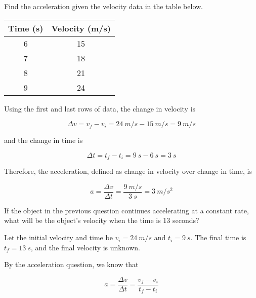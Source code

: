 \documentclass[answers]{exam}
\begin{document}
\begin{questions}
\question
Find the acceleration given the velocity data in the table below.

\begin{center}
    \begin{tabular}{|c|c|}
        \hline
        Time (s) & Velocity (m/s) \\ \hline
        6 & 15\\ \hline
        7 & 18\\ \hline
        8 & 21\\ \hline
        9 & 24 \\ \hline
    \end{tabular}
\end{center}

\begin{solutionorbox}[5cm]
    Using the first and last rows of data, the change in velocity is

\begin{equation*}
    \Delta v = v_f - v_i = \SI{24}{m/s} - \SI{15}{m/s} = \SI{9}{m/s}
\end{equation*}

and the change in time is

\begin{equation*}
    \Delta t = t_f - t_i = \SI{9}{s} - \SI{6}{s} = \SI{3}{s}
\end{equation*}

Therefore, the acceleration, defined as change in velocity over change in time, is

\begin{equation*}
    a = \frac{\Delta v}{\Delta t} = \frac{\SI{9}{m/s}}{\SI{3}{s}} = \boxed{\SI{3}{m/s^2}}
\end{equation*}
\end{solutionorbox}

\clearpage
\question
If the object in the previous question continues accelerating at a constant rate, what will be the object's velocity when the time is 13 seconds?

\begin{solutionorbox}[5cm]
Let the initial velocity and time be $v_i = \SI{24}{m/s}$ and $t_i = \SI{9}{s}$. The final time is $t_f = \SI{13}{s}$, and the final velocity is unknown.

By the acceleration question, we know that

\begin{equation*}
    a = \frac{\Delta v}{\Delta t} = \frac{v_f - v_i}{t_f - t_i}
\end{equation*}


\end{solutionorbox}
\end{questions}
\end{document}
